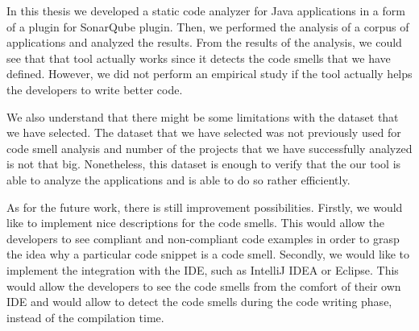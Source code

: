 
In this thesis we developed a static code analyzer for Java applications in a form
of a plugin for SonarQube plugin.
Then, we performed the analysis of a corpus of applications and analyzed the results.
From the results of the analysis, we could see that that tool actually works since it
detects the code smells that we have defined.
However, we did not perform an empirical study if the tool actually helps the developers to
write better code.

We also understand that there might be some limitations with the dataset that we have selected.
The dataset that we have selected was not previously used for code smell analysis and number of the
projects that we have successfully analyzed is not that big.
Nonetheless, this dataset is enough to verify that the our tool is able to analyze the applications and is able
to do so rather efficiently.

As for the future work, there is still improvement possibilities.
Firstly, we would like to implement nice descriptions for the code smells.
This would allow the developers to see compliant and non-compliant code examples in order to grasp
the idea why a particular code snippet is a code smell.
Secondly, we would like to implement the integration with the IDE, such as IntelliJ IDEA or Eclipse.
This would allow the developers to see the code smells from the comfort of their own IDE and would allow
to detect the code smells during the code writing phase, instead of the compilation time.
